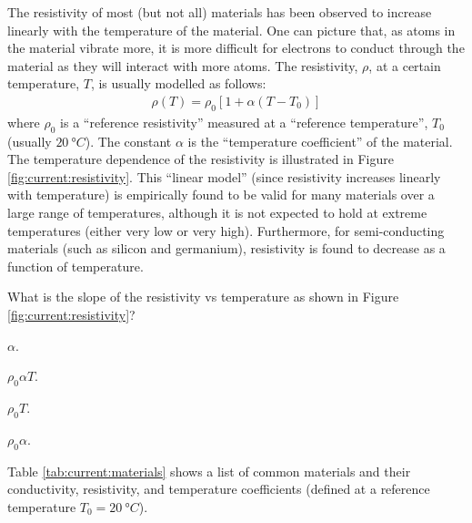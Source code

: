 The resistivity of most (but not all) materials has been observed to increase linearly with the temperature of the material. One can picture that, as atoms in the material vibrate more, it is more difficult for electrons to conduct through the material as they will interact with more atoms. The resistivity, $\rho$, at a certain temperature, $T$, is usually modelled as follows:
\begin{align*}
\rho(T)=\rho_0\left[ 1 + \alpha (T-T_0)\right]
\end{align*}
where $\rho_0$ is a ``reference resistivity'' measured at a ``reference temperature'', $T_0$ (usually $\SI{20}{\degree C}$). The constant $\alpha$ is the ``temperature coefficient'' of the material. The temperature dependence of the resistivity is illustrated in Figure \ref{fig:current:resistivity}.
This ``linear model'' (since resistivity increases linearly with temperature) is empirically found to be valid for many materials over a large range of temperatures, although it is not expected to hold at extreme temperatures (either very low or very high). Furthermore, for semi-conducting materials (such as silicon and germanium), resistivity is found to decrease as a function of temperature.
\begin{checkpoint}
	What is the slope of the resistivity vs temperature as shown in Figure \ref{fig:current:resistivity}?
	\begin{MCquestion}{}
		\item $\alpha$.
		\item $\rho_0 \alpha T$.
		\item $\rho_0 T$.
		\item $\rho_0 \alpha$.  \correct
	\end{MCquestion}
\end{checkpoint}
Table \ref{tab:current:materials} shows a list of common materials and their conductivity, resistivity, and temperature coefficients (defined at a reference temperature $T_0=\SI{20}{\degree C}$).

